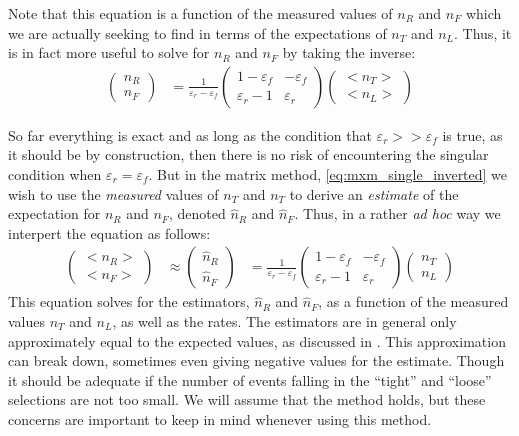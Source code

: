 Note that this equation is a function of the measured values of
$n_R$ and $n_F$ which we are actually seeking to find in terms of the 
expectations of $n_T$ and $n_L$. Thus, it is in fact more
useful to solve for $n_R$ and $n_F$ by taking the inverse:
\begin{align}
  \label{eq:mxm_single_inverted}
  \begin{pmatrix} n_R \\ n_F \end{pmatrix} 
  &= 
  \frac{1}{\varepsilon_r-\varepsilon_f}
  \begin{pmatrix}
  1-\varepsilon_f & -\varepsilon_f \\ \varepsilon_r-1 & \varepsilon_r	
  \end{pmatrix} 
  \begin{pmatrix} <n_T> \\ <n_L> \end{pmatrix}
\end{align}

So far everything is exact and as long as the condition
that $\varepsilon_r>>\varepsilon_f$ is true,
as it should be by construction, 
then there is no risk of encountering the singular condition
when $\varepsilon_r=\varepsilon_f$.
But in the matrix method, \eqn\eqref{eq:mxm_single_inverted}
we wish to use the \emph{measured} values of $n_T$
and $n_T$ to derive an \emph{estimate} of the expectation
for $n_R$ and $n_F$, denoted $\hat{n}_R$ and $\hat{n}_F$. 
Thus, in a rather \emph{ad hoc} way 
we interpert the equation as follows:
\begin{align}
  \label{eq:mxm_single_inverted_approx}
  \begin{pmatrix} <n_R> \\ <n_F> \end{pmatrix} 
  &\approx
  \begin{pmatrix} \hat{n}_R \\ \hat{n}_F \end{pmatrix} 
  &= 
  \frac{1}{\varepsilon_r-\varepsilon_f}
  \begin{pmatrix}
  1-\varepsilon_f & -\varepsilon_f \\ \varepsilon_r-1 & \varepsilon_r	
  \end{pmatrix} 
  \begin{pmatrix} n_T \\ n_L \end{pmatrix}
\end{align}
This equation solves for the estimators, $\hat{n}_R$ and $\hat{n}_F$,
as a function of the measured values $n_T$ and $n_L$, as well 
as the rates. The estimators are in general only approximately equal
to the expected values, as discussed in \cite{Gillam:2014xua}.
This approximation can break down, sometimes even giving negative values
for the estimate.  Though it should be adequate if the number
of events falling in the ``tight'' and ``loose'' selections are 
not too small.
We will assume that the method holds, but these concerns are important
to keep in mind whenever using this method.


